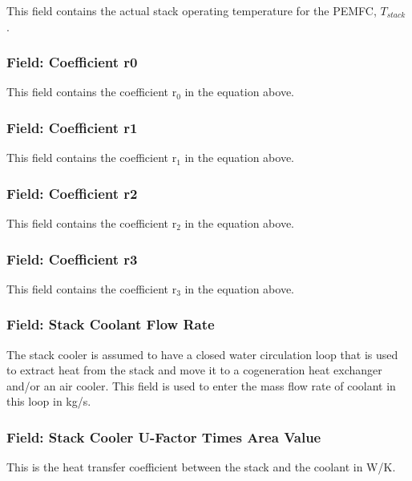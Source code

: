This field contains the actual stack operating temperature for the PEMFC, \({T_{stack}}\) .

\subsubsection{Field: Coefficient r0}\label{field-coefficient-r0}

This field contains the coefficient r\(_{0}\) in the equation above.

\subsubsection{Field: Coefficient r1}\label{field-coefficient-r1}

This field contains the coefficient r\(_{1}\) in the equation above.

\subsubsection{Field: Coefficient r2}\label{field-coefficient-r2}

This field contains the coefficient r\(_{2}\) in the equation above.

\subsubsection{Field: Coefficient r3}\label{field-coefficient-r3}

This field contains the coefficient r\(_{3}\) in the equation above.

\subsubsection{Field: Stack Coolant Flow Rate}\label{field-stack-coolant-flow-rate}

The stack cooler is assumed to have a closed water circulation loop that is used to extract heat from the stack and move it to a cogeneration heat exchanger and/or an air cooler. This field is used to enter the mass flow rate of coolant in this loop in kg/s.

\subsubsection{Field: Stack Cooler U-Factor Times Area Value}\label{field-stack-cooler-u-factor-times-area-value}

This is the heat transfer coefficient between the stack and the coolant in W/K.

